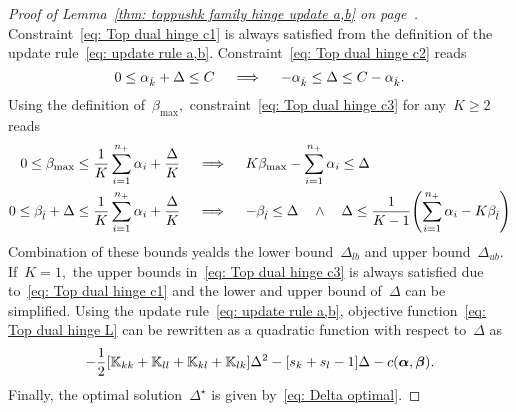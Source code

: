 \topruleab*
\begin{proof}[Proof of Lemma~\ref{thm: toppushk family hinge update a,b} on page~\pageref{thm: toppushk family hinge update a,b}]
  Constraint~\eqref{eq: Top dual hinge c1} is always satisfied from the definition of the update rule~\eqref{eq: update rule a,b}. Constraint~\eqref{eq: Top dual hinge c2} reads
  \begin{equation*}
    0 \leq \alpha_{\hat{k}} + \Delta \leq C
    \quad \implies \quad
    - \alpha_{\hat{k}} \leq \Delta \leq C - \alpha_{\hat{k}}.
  \end{equation*}
  Using the definition of~$\beta_{\max},$ constraint~\eqref{eq: Top dual hinge c3} for any~$K \geq 2$ reads
  \begin{align*}
    0 \leq \beta_{\max} \leq \frac{1}{K} \sum_{i = 1}^{\npos} \alpha_i + \frac{\Delta}{K} 
    & \quad \implies \quad
    K\beta_{\max} - \sum_{i = 1}^{\npos} \alpha_i \leq \Delta \\
    0 \leq \betal + \Delta \leq \frac{1}{K} \sum_{i = 1}^{\npos} \alpha_i + \frac{\Delta}{K}
    & \quad \implies \quad
    -\betal \leq \Delta \quad \land \quad \Delta \leq \frac{1}{K-1}\Brac{\sum_{i = 1}^{\npos} \alpha_i - K \betal}
  \end{align*}
  Combination of these bounds yealds the lower bound~$\Delta_{lb}$ and upper bound~$\Delta_{ub}.$ If~$K = 1,$ the upper bounds in~\eqref{eq: Top dual hinge c3} is always satisfied due to~\eqref{eq: Top dual hinge c1} and the lower and upper bound of~$\Delta$ can be simplified. Using the update rule~\eqref{eq: update rule a,b}, objective function~\eqref{eq: Top dual hinge L} can be rewritten as a quadratic function with respect to~$\Delta$ as
  \begin{equation*}
    - \frac{1}{2} \Brac[s]{\K_{kk} + \K_{ll} + \K_{kl} + \K_{lk}} \Delta^2
    - \Brac[s]{s_k + s_l - 1} \Delta
    - c(\bm{\alpha}, \bm{\beta}).
  \end{equation*}
  Finally, the optimal solution~$\Delta^{\star}$ is given by~\eqref{eq: Delta optimal}.
\end{proof}


